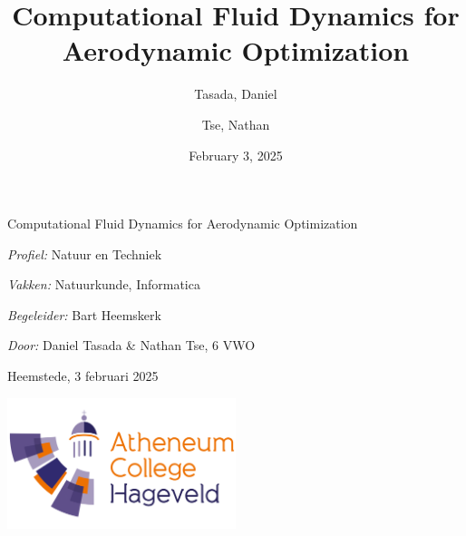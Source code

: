 \documentclass[a4paper,12pt,titlepage]{article}
\title{Computational Fluid Dynamics for Aerodynamic Optimization}
\author{
  Tasada, Daniel\\
  \and
  Tse, Nathan\\
}
\date{February 3, 2025}
\begin{document}
\maketitle

\shipout\null

\begin{center}
    \vspace*{2cm}
    
    {\huge Computational Fluid Dynamics for Aerodynamic Optimization}
    
    \vspace{3cm}
    
    \textit{Profiel:} Natuur en Techniek
    
    \vspace{1cm}
    
    \textit{Vakken:} Natuurkunde, Informatica
    
    \vspace{1cm}
    
    \textit{Begeleider:} Bart Heemskerk
    
    \vspace{1cm}
    
    \textit{Door:} Daniel Tasada \& Nathan Tse, 6 VWO
    
    \vspace{1cm}
    
    Heemstede, 3 februari 2025
    
    \vspace{3cm}
    
    \includegraphics[width=0.5\textwidth]{resources/watermark.png}
\end{center}
\end{document}
